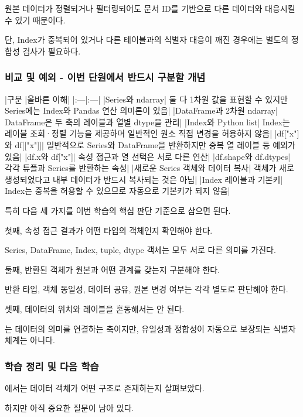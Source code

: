 원본 데이터가 정렬되거나 필터링되어도 문서 ID를 기반으로 다른 데이터와 대응시킬 수 있기 때문이다.

단, Index가 중복되어 있거나 다른 테이블과의 식별자 대응이 깨진 경우에는 별도의 정합성 검사가 필요하다.

\subsubsection{비교 및 예외 - 이번 단원에서 반드시 구분할 개념}

\begin{dhktable}
|구분	|올바른 이해|
|:---|:---|
|Series와 ndarray|	둘 다 1차원 값을 표현할 수 있지만 Series에는 Index와 Pandas 연산 의미론이 있음|
|DataFrame과 2차원 ndarray|	DataFrame은 두 축의 레이블과 열별 dtype을 관리|
|Index와 Python list|	Index는 레이블 조회·정렬 기능을 제공하며 일반적인 원소 직접 변경을 허용하지 않음|
|df["x"]와 df[["x"]]|	일반적으로 Series와 DataFrame을 반환하지만 중복 열 레이블 등 예외가 있음|
|df.x와 df["x"]|	속성 접근과 열 선택은 서로 다른 연산|
|df.shape와 df.dtypes|	각각 튜플과 Series를 반환하는 속성|
|새로운 Series 객체와 데이터 복사|	객체가 새로 생성되었다고 내부 데이터가 반드시 복사되는 것은 아님|
|Index 레이블과 기본키|	Index는 중복을 허용할 수 있으므로 자동으로 기본키가 되지 않음|
\end{dhktable}

특히 다음 세 가지를 이번 학습의 핵심 판단 기준으로 삼으면 된다.

첫째, 속성 접근 결과가 어떤 타입의 객체인지 확인해야 한다.

Series, DataFrame, Index, tuple, dtype 객체는 모두 서로 다른 의미를 가진다.

둘째, 반환된 객체가 원본과 어떤 관계를 갖는지 구분해야 한다.

반환 타입, 객체 동일성, 데이터 공유, 원본 변경 여부는 각각 별도로 판단해야 한다.

셋째, 데이터의 위치와 레이블을 혼동해서는 안 된다.

는 데이터의 의미를 연결하는 축이지만, 유일성과 정합성이 자동으로 보장되는 식별자 체계는 아니다.

\subsubsection{학습 정리 및 다음 학습}

에서는 데이터 객체가 어떤 구조로 존재하는지 살펴보았다.

하지만 아직 중요한 질문이 남아 있다.


